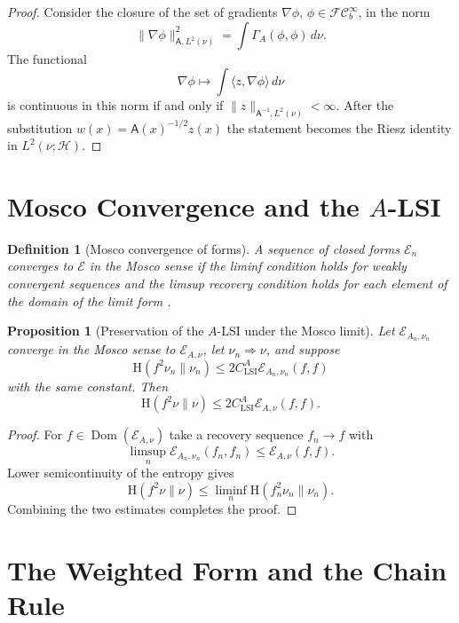 \documentclass{article}
\newtheorem{proposition}[theorem]{Proposition}
\newtheorem{definition}[theorem]{Definition}
\newcommand{\Hh}{\mathcal H}
\newcommand{\Ent}{\mathrm H}
\newcommand{\Asf}{\mathsf A}
\newcommand{\Dom}{\operatorname{Dom}}
\newcommand{\FC}{\mathcal{FC}_b^\infty}
\begin{document}
\begin{proof}
Consider the closure of the set of gradients \(\nabla\phi\), \(\phi\in\FC\),
in the norm
\[
        \|\nabla\phi\|_{\Asf,L^2(\nu)}^2
        =
        \int\Gamma_A(\phi,\phi)\,d\nu .
\]
The functional
\[
        \nabla\phi\mapsto\int\langle z,\nabla\phi\rangle\,d\nu
\]
is continuous in this norm if and only if
\(\|z\|_{\Asf^{-1},L^2(\nu)}<\infty\). After the substitution
\(w(x)=\Asf(x)^{-1/2}z(x)\) the statement becomes the Riesz identity in
\(L^2(\nu;\Hh)\).
\end{proof}


\section{Mosco Convergence and the \(A\)-LSI}

\begin{definition}[Mosco convergence of forms]
A sequence of closed forms \(\mathcal E_n\) converges to \(\mathcal E\) in the
Mosco sense if the liminf condition holds for weakly convergent sequences and
the limsup recovery condition holds for each element of the domain of the
limit form \cite{Mosco,KuwaeShioya}.
\end{definition}

\begin{proposition}[Preservation of the \(A\)-LSI under the Mosco limit]
\label{prop:mosco-lsi}
Let \(\mathcal E_{A_n,\nu_n}\) converge in the Mosco sense to
\(\mathcal E_{A,\nu}\), let \(\nu_n\Rightarrow\nu\), and suppose
\[
        \Ent(f^2\nu_n\|\nu_n)
        \le
        2C_{\mathrm{LSI}}^A\mathcal E_{A_n,\nu_n}(f,f)
\]
with the same constant. Then
\[
        \Ent(f^2\nu\|\nu)
        \le
        2C_{\mathrm{LSI}}^A\mathcal E_{A,\nu}(f,f).
\]
\end{proposition}

\begin{proof}
For \(f\in\Dom(\mathcal E_{A,\nu})\) take a recovery sequence \(f_n\to f\) with
\[
        \limsup_n\mathcal E_{A_n,\nu_n}(f_n,f_n)\le\mathcal E_{A,\nu}(f,f).
\]
Lower semicontinuity of the entropy gives
\[
        \Ent(f^2\nu\|\nu)
        \le \liminf_n\Ent(f_n^2\nu_n\|\nu_n).
\]
Combining the two estimates completes the proof.
\end{proof}

\section{The Weighted Form and the Chain Rule}
\end{document}
